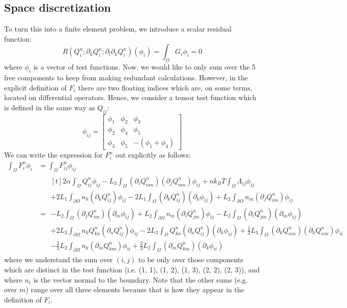\documentclass[reqno]{article}
\begin{document}
	\subsection{Space discretization}
	To turn this into a finite element problem, we introduce a scalar residual function:
	\begin{equation}
		R \left(Q^n_i ; \partial_k Q^n_i ; \partial_l \partial_k Q^n_i\right) (\phi_i)
		= \int_\Omega G_i \phi_i
		= 0
	\end{equation}
	where $\phi_i$ is a vector of test functions.
	Now, we would like to only sum over the 5 free components to keep from making redundant calculations.
	However, in the explicit definition of $F_i$ there are two floating indices which are, on some terms, located on differential operators.
	Hence, we consider a tensor test function which is defined in the same way as $Q_{ij}$:
	\begin{equation}
		\phi_{ij}
		= \begin{bmatrix}
		\phi_1 & \phi_2 & \phi_3 \\
		\phi_2 & \phi_4 & \phi_5 \\
		\phi_3 & \phi_5 & -(\phi_1 + \phi_4)
		\end{bmatrix}
	\end{equation}
	We can write the expression for $F^n_i$ out explicitly as follows:
	\begin{equation}
	\begin{split}
		\int_\Omega F^n_i \phi_i
		&=
		\int_\Omega F^n_{ij} \phi_{ij} \\
		&= 
		\begin{multlined}[t]
			2 \alpha \int_\Omega Q^n_{ij} \phi_{ij}
			- L_3 \int_\Omega (\partial_i Q^n_{nm})(\partial_j Q^n_{nm}) \phi_{ij}
			+ n k_B T \int_\Omega \Lambda_{ij} \phi_{ij} \\
			+ 2 L_1 \int_{\partial \Omega} n_k (\partial_k Q^n_{ij}) \phi_{ij}
			- 2 L_1 \int_{\Omega} (\partial_k Q^n_{ij})(\partial_k \phi_{ij}) 
			+ L_2 \int_{\partial \Omega} n_m (\partial_j Q^n_{im}) \phi_{ij} \\
			- L_2 \int_\Omega (\partial_j Q^n_{im}) (\partial_m \phi_{ij}) 
			+ L_2 \int_{\partial \Omega} n_m (\partial_i Q^n_{jm}) \phi_{ij}
			- L_2 \int_\Omega (\partial_i Q^n_{jm}) (\partial_m \phi_{ij}) \\
			+ 2 L_3 \int_{\partial \Omega} n_k Q^n_{kn} (\partial_n Q^n_{ij}) \phi_{ij} 
			- 2 L_3 \int_\Omega Q^n_{kn} (\partial_n Q^n_{ij}) (\partial_k \phi_{ij})
			+ \tfrac13 L_3 \int_\Omega (\partial_k Q^n_{nm}) (\partial_k Q^n_{nm}) \phi_{ii} \\
			- \tfrac23 L_2 \int_{\partial \Omega} n_k (\partial_m Q^n_{km}) \phi_{ii}
			+ \tfrac23 L_2 \int_\Omega (\partial_m Q^n_{km}) (\partial_k \phi_{ii})
		\end{multlined}
	\end{split}
	\end{equation}
	where we understand the sum over $(i, j)$ to be only over those components which are distinct in the test function (i.e. (1, 1), (1, 2), (1, 3), (2, 2), (2, 3)), and where $n_i$ is the vector normal to the boundary.
	Note that the other sums (e.g. over $m$) range over all three elements because that is how they appear in the definition of $F_i$.
	
\end{document}
